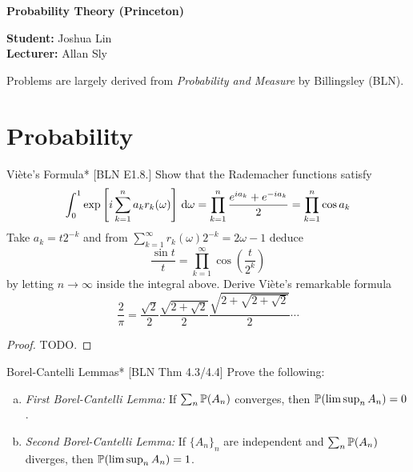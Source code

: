 





\begin{Large}
    \textsf{\textbf{Probability Theory (Princeton)}}
\end{Large}

\vspace{1ex}

\textsf{\textbf{Student:}} Joshua Lin \\
\textsf{\textbf{Lecturer:}} Allan Sly

\vspace{2ex}

Problems are largely derived from \emph{Probability and Measure} by Billingsley (BLN).

\section{Probability}

\begin{problem}{Vi\`ete's Formula}*
    [BLN E1.8.] Show that the Rademacher functions satisfy 
    \[
        \int_0^1 \exp \left[ i \sum_{k=1}^n a_k r_k(\omega) \right] \, \mathrm{d} \omega
        = \prod_{k=1}^n \frac{e^{ia_k} + e^{-ia_k}}{2}
        = \prod_{k=1}^n \cos{a_k}
    \]
    Take \(a_k = t2^{-k}\) and from \(\sum_{k=1}^\infty r_k(\omega) 2^{-k} = 2\omega - 1\) deduce 
    \[
        \frac{\sin{t}}{t} = \prod_{k=1}^\infty \cos \left( \frac{t}{2^k} \right) 
    \]
    by letting \(n \to \infty\) inside the integral above. Derive Vi\`ete's remarkable formula
    \[
        \frac{2}{\pi} = \frac{\sqrt{2}}{2} \frac{\sqrt{2 + \sqrt{2}}}{2} \frac{\sqrt{2 + \sqrt{2 + \sqrt{2}}}}{2} \cdots
    \]
\end{problem}


\begin{proof}
    TODO. 
\end{proof}


\begin{problem}{Borel-Cantelli Lemmas}*
    [BLN Thm 4.3/4.4] Prove the following:
    \begin{enumerate}[(a)]
        \itemsep0em
        \item \emph{First Borel-Cantelli Lemma:} If \(\sum_n \mathbb{P}(A_n)\) converges, then \(\mathbb{P}(\limsup_n A_n) = 0\).
        \item \emph{Second Borel-Cantelli Lemma:} If \(\{A_n\}_n\) are independent and \(\sum_n \mathbb{P}(A_n)\) diverges, then \(\mathbb{P}(\limsup_n A_n) = 1\).
    \end{enumerate}
\end{problem}


